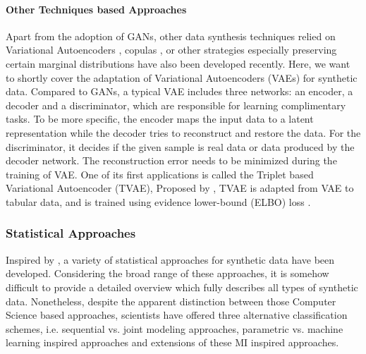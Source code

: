 \paragraph{Other Techniques based Approaches}
Apart from the adoption of GANs, other data synthesis techniques relied on Variational Autoencoders \citep{vardhan2020generating,ma2020vaem},
copulas \citep{patki2016synthetic,kamthe2021copula}, or other strategies especially preserving certain marginal distributions \citep{mckenna2019graphical} have also
been developed recently. Here, we want to shortly cover the adaptation of Variational Autoencoders (VAEs) for synthetic data. Compared to GANs,
a typical VAE includes three networks: an encoder, a decoder and a discriminator, which are responsible for learning complimentary tasks. To be more specific,
the encoder maps the input data to a latent representation while the decoder tries to reconstruct and restore the data. For the discriminator, it decides
if the given sample is real data or data produced by the decoder network. The reconstruction error needs to be minimized during the training of VAE. 
One of its first applications is called the Triplet based Variational Autoencoder (TVAE), Proposed by \citet{xu2019modeling}, TVAE is adapted from VAE to tabular data, and
is trained using evidence lower-bound (ELBO) loss \citep{kingma2013auto}.

\subsubsection{Statistical Approaches}
\label{subsubsec:statsapproach}
Inspired by \citep{rubin1993statistical}, a variety of statistical approaches for synthetic data have been developed. Considering the 
broad range of these approaches, it is somehow difficult to provide a detailed overview which fully describes all types of synthetic data.
Nonetheless, despite the apparent distinction between those Computer Science based approaches, scientists have offered three alternative classification schemes, 
i.e.  sequential vs. joint modeling approaches, parametric vs. machine learning inspired approaches and extensions of these MI inspired approaches.


